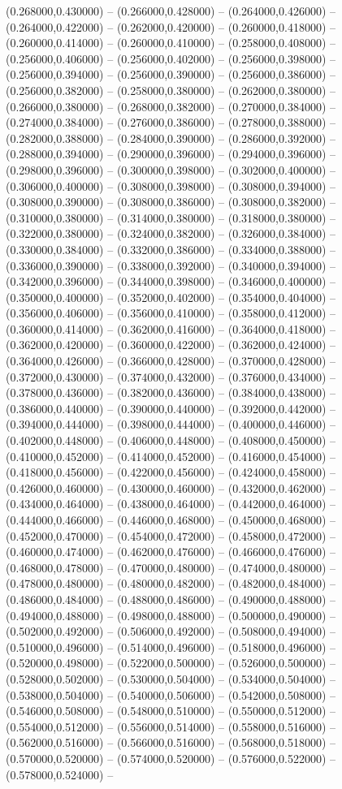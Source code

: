 (0.268000,0.430000) -- (0.266000,0.428000) -- (0.264000,0.426000) -- (0.264000,0.422000) -- (0.262000,0.420000) -- (0.260000,0.418000) -- (0.260000,0.414000) -- (0.260000,0.410000) -- (0.258000,0.408000) -- (0.256000,0.406000) -- (0.256000,0.402000) -- (0.256000,0.398000) -- (0.256000,0.394000) -- (0.256000,0.390000) -- (0.256000,0.386000) -- (0.256000,0.382000) -- (0.258000,0.380000) -- (0.262000,0.380000) -- (0.266000,0.380000) -- (0.268000,0.382000) -- (0.270000,0.384000) -- (0.274000,0.384000) -- (0.276000,0.386000) -- (0.278000,0.388000) -- (0.282000,0.388000) -- (0.284000,0.390000) -- (0.286000,0.392000) -- (0.288000,0.394000) -- (0.290000,0.396000) -- (0.294000,0.396000) -- (0.298000,0.396000) -- (0.300000,0.398000) -- (0.302000,0.400000) -- (0.306000,0.400000) -- (0.308000,0.398000) -- (0.308000,0.394000) -- (0.308000,0.390000) -- (0.308000,0.386000) -- (0.308000,0.382000) -- (0.310000,0.380000) -- (0.314000,0.380000) -- (0.318000,0.380000) -- (0.322000,0.380000) -- (0.324000,0.382000) -- (0.326000,0.384000) -- (0.330000,0.384000) -- (0.332000,0.386000) -- (0.334000,0.388000) -- (0.336000,0.390000) -- (0.338000,0.392000) -- (0.340000,0.394000) -- (0.342000,0.396000) -- (0.344000,0.398000) -- (0.346000,0.400000) -- (0.350000,0.400000) -- (0.352000,0.402000) -- (0.354000,0.404000) -- (0.356000,0.406000) -- (0.356000,0.410000) -- (0.358000,0.412000) -- (0.360000,0.414000) -- (0.362000,0.416000) -- (0.364000,0.418000) -- (0.362000,0.420000) -- (0.360000,0.422000) -- (0.362000,0.424000) -- (0.364000,0.426000) -- (0.366000,0.428000) -- (0.370000,0.428000) -- (0.372000,0.430000) -- (0.374000,0.432000) -- (0.376000,0.434000) -- (0.378000,0.436000) -- (0.382000,0.436000) -- (0.384000,0.438000) -- (0.386000,0.440000) -- (0.390000,0.440000) -- (0.392000,0.442000) -- (0.394000,0.444000) -- (0.398000,0.444000) -- (0.400000,0.446000) -- (0.402000,0.448000) -- (0.406000,0.448000) -- (0.408000,0.450000) -- (0.410000,0.452000) -- (0.414000,0.452000) -- (0.416000,0.454000) -- (0.418000,0.456000) -- (0.422000,0.456000) -- (0.424000,0.458000) -- (0.426000,0.460000) -- (0.430000,0.460000) -- (0.432000,0.462000) -- (0.434000,0.464000) -- (0.438000,0.464000) -- (0.442000,0.464000) -- (0.444000,0.466000) -- (0.446000,0.468000) -- (0.450000,0.468000) -- (0.452000,0.470000) -- (0.454000,0.472000) -- (0.458000,0.472000) -- (0.460000,0.474000) -- (0.462000,0.476000) -- (0.466000,0.476000) -- (0.468000,0.478000) -- (0.470000,0.480000) -- (0.474000,0.480000) -- (0.478000,0.480000) -- (0.480000,0.482000) -- (0.482000,0.484000) -- (0.486000,0.484000) -- (0.488000,0.486000) -- (0.490000,0.488000) -- (0.494000,0.488000) -- (0.498000,0.488000) -- (0.500000,0.490000) -- (0.502000,0.492000) -- (0.506000,0.492000) -- (0.508000,0.494000) -- (0.510000,0.496000) -- (0.514000,0.496000) -- (0.518000,0.496000) -- (0.520000,0.498000) -- (0.522000,0.500000) -- (0.526000,0.500000) -- (0.528000,0.502000) -- (0.530000,0.504000) -- (0.534000,0.504000) -- (0.538000,0.504000) -- (0.540000,0.506000) -- (0.542000,0.508000) -- (0.546000,0.508000) -- (0.548000,0.510000) -- (0.550000,0.512000) -- (0.554000,0.512000) -- (0.556000,0.514000) -- (0.558000,0.516000) -- (0.562000,0.516000) -- (0.566000,0.516000) -- (0.568000,0.518000) -- (0.570000,0.520000) -- (0.574000,0.520000) -- (0.576000,0.522000) -- (0.578000,0.524000) -- 